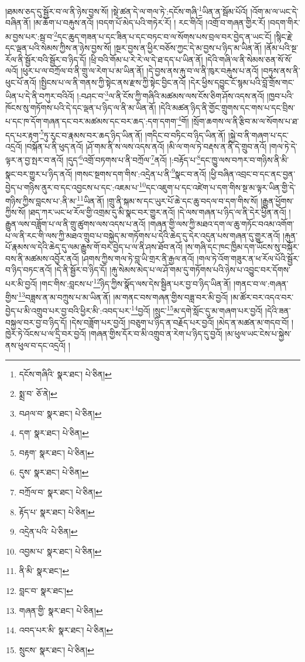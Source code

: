 །ཐམས་ཅད་དུ་སྦྱོར་བ་ལ་ནི་ཉེས་བྱས་སོ། །སྡེ་ཚན་དེ་ལ་གལ་ཏེ་:དངོས་གཞི་\footnote{དངོས་གཞིའི་  སྣར་ཐང་།  པེ་ཅིན། }ཡིན་ན་སྦོམ་པོའོ། །འོག་མ་ལ་ཡང་དེ་བཞིན་ནོ། །མ་ཆོག་པ་བརྐུས་ནའོ། །བདག་པོ་མེད་པའི་གཏེར་རོ། །
རང་གིའོ། །འགྲོ་བ་གཞན་གྱིར་རོ། །བདག་གིར་མ་བྱས་པར་:སྦ་བ་\footnote{སྨྲ་བ་  ཅོ་ནེ། }དང་ཆུད་གཟན་པ་དང་ཟིན་པ་དང་བཏང་བ་ལ་སོགས་པས་བྲལ་བར་བྱེད་ན་ཡང་ངོ། །སྙིང་རྗེ་དང་ལྡན་པའི་སེམས་ཀྱིས་ན་ཉེས་བྱས་སོ། །སྔར་བྱས་ན་ཕྱིར་བཅོས་ཀྱང་དེ་མ་བྱས་པ་ཉིད་མ་ཡིན་ནོ། །ནོམ་པའི་སྔ་རོལ་ནི་སྦྱོར་བའི་སྦྱོར་བ་ཉིད་དོ། །ཕྲི་བའི་གོམ་པ་རེ་རེ་ལ་དེ་ཐ་དད་པ་ཡིན་ནོ། །དེའི་གཞི་ལ་ནི་སེམས་ཅན་སོ་སོ་ལའོ། །ཕུར་པ་ལ་བཀྲོལ་བ་ནི་གྲུ་ལ་རེག་པ་མ་ཡིན་ནོ། །དེ་བྱས་ནས་རྐུ་བ་ལ་ནི་ཁུར་བརྐུས་པ་ནའོ། །བཏུས་ནས་ནི་ཕུང་པོ་ནའོ། །སྤྱིངས་པ་ལ་ནི་གནས་ཀྱི་སྟེང་ནས་རྫས་ཀྱི་སྟེང་བྱིང་ནའོ། །དེར་ཕྱིས་དབྱུང་ངོ་སྙམ་པའི་བློ་གྲོས་གང་ཡིན་པ་དེ་ནི་བཀུར་བའིའོ། །:བཤང་བ་\footnote{བཤལ་བ་  སྣར་ཐང་།  པེ་ཅིན། }ལ་ནི་ངོས་ཀྱི་གཞིའི་མཚམས་ལས་ངོས་ཅིག་ཤོས་འདས་ནའོ། །ཁྱབ་པའི་ཁོངས་སུ་གཏོགས་པའི་དེ་དང་ལྡན་པ་ཉིད་ལ་ནི་མ་ཡིན་ནོ། །དེའི་མཚན་ཉིད་ནི་གྱོང་གྲུགས་དང་གས་པ་དང་བྲིས་པ་དང་ཁ་དོག་གཞན་དང་བར་མཚམས་དང་བར་ཆད་:དག་དགག་\footnote{དག་  སྣར་ཐང་།  པེ་ཅིན། }གོ། །སྲོག་ཆགས་ལ་ནི་རྩིབ་མ་ལ་སོགས་པ་ཐ་དད་པར་རྟག་\footnote{བརྟག་  སྣར་ཐང་།  པེ་ཅིན། }ཏུ་རུང་བ་རྣམས་བར་ཆད་ཉིད་ཡིན་ནོ། །གདིང་བ་བཏིང་བ་ཉིད་ཡིན་ནོ། །སྐྱེ་བ་ནི་གཞག་པ་དང་འདྲའོ། །བསྐོན་པ་ནི་ཕུད་ནའོ། །ཤོ་གམ་ནི་ས་ལས་འདས་ནའོ། །མི་ལ་གལ་ཏེ་བརྡས་ན་ནི་དེ་གྲུབ་ནའོ། །གལ་ཏེ་དེ་ལྟར་ན་བྱ་སྤར་བ་ནའོ། །དུད་\footnote{དུས་  སྣར་ཐང་།  པེ་ཅིན། }འགྲོ་བཏགས་པ་ནི་བཀྲོལ་\footnote{བཀྲོལ་བ་  སྣར་ཐང་།  པེ་ཅིན། }ནའོ། །:བརྟོད་པ་\footnote{རྟོད་པ་  སྣར་ཐང་།  པེ་ཅིན། }དང་ཁྱུ་ལས་བཀར་བ་གཉིས་ནི་མི་སྣང་བར་གྱུར་པ་ཉིད་ནའོ། །གསང་སྔགས་དག་གིས་:འདྲེན་པ་ནི་\footnote{འདྲེན་པའི་  པེ་ཅིན། }སྣང་བ་ནའོ། །ཕྱི་བཞིན་འབྲང་བ་དང་ནང་བྱན་བྱེད་པ་གཉིས་ནུར་བ་དང་འབྱངས་པ་དང་:འཇམ་པ་\footnote{འབྱམ་པ་  སྣར་ཐང་།  པེ་ཅིན། }དང་འཇུག་པ་དང་འཛེག་པ་དག་གིས་སྔ་མ་ལྟར་ཡིན་གྱི་དེ་གཉིས་ཀྱིས་བླངས་པ་:ནི་མ་\footnote{ནི་མི་  སྣར་ཐང་། }ཡིན་ནོ། །གྲུ་ནི་སྐམ་ས་དང་ཡུར་པོ་ཆེ་དང་ཆུ་བདལ་བ་དག་གིས་སོ། །རྒྱུན་ཕྱོགས་ཀྱིས་སོ། །ཐད་ཀར་ཡང་ཕ་རོལ་གྱི་འགྲམ་དུ་མི་སྣང་བར་གྱུར་ནའོ། །དེ་ལས་གཞན་པ་ཉིད་ལ་ནི་དེར་ཕྱིན་ནའོ། །རྒྱུན་ལས་བཟློག་པ་ལ་ནི་གྲུ་ཚུགས་ལས་འདས་པ་ནའོ། །གཞན་གྱི་ལས་ཀྱི་མཐའ་དག་ལ་ཆུ་གཏོང་བའམ་འགོག་པ་ལ་ནི་རང་གི་ལས་ཀྱི་མཐའ་གྲུབ་པ་བསྐྱེད་མ་གཏོགས་པ་དེའི་ཆེད་དུ་དེར་འདུན་པས་གཞན་དུ་གྱུར་ནའོ། །རྐུན་པོ་རྣམས་ལ་དེའི་ཆེད་དུ་ལམ་རྒྱུས་གོ་བར་བྱེད་པ་ལ་ནི་ཤས་ཐོབ་ནའོ། །ས་གཞི་དང་ཁང་ཁྱིམ་དག་ཡོངས་སུ་བསྐོར་བས་ནི་མཚམས་འབྱོར་ནའོ། །ཤགས་ཀྱིས་གལ་ཏེ་བླ་ཡི་གྲར་ནི་རྒྱལ་ནའོ། །གལ་ཏེ་འོག་གཟུར་ན་ཕ་རོལ་པོའི་སྦྱོར་བ་ཉིད་བཏང་ནའོ། །དེ་ནི་སྦྱོར་བ་ཉིད་དོ། །རྐུ་སེམས་མེད་པ་ལ་ཤོ་གམ་དུ་གཏོགས་པའི་ཉེས་པ་འབྱུང་བར་དོགས་པར་མི་བྱའོ། །གང་གིས་:བླངས་པ་\footnote{བླང་བ་  སྣར་ཐང་། }ཉིད་ཀྱིས་སྣོད་ལས་དེས་སྦྱིན་པར་བྱ་བ་ཉིད་ཡིན་ནོ། །གནང་བ་ལ་:གཞན་གྱིས་\footnote{གཞན་གྱི་  སྣར་ཐང་།  པེ་ཅིན། }བཟླས་ན་མ་བཀྲུས་པ་མ་ཡིན་ནོ། །མ་གནང་བས་གཞན་གྱིས་བཟླ་བར་མི་བྱའོ། །མ་ཚོར་བར་འདའ་བར་བྱེད་པ་མི་འགྲུབ་པར་བྱ་བའི་ཕྱིར་མི་:འབད་པར་\footnote{འབད་པར་མི་  སྣར་ཐང་།  པེ་ཅིན། }བྱའོ། །སྲུང་\footnote{སྲུངས་  སྣར་ཐང་།  པེ་ཅིན། }མ་དགེ་སློང་དུ་མ་གཞག་པར་བྱའོ། །དེའི་ཟན་བསྐྱལ་བར་བྱ་བ་ཉིད་དོ། །དེས་བཟློག་པར་བྱའོ། །བཅུག་པ་ཉིད་ན་བརྗོད་པར་བྱའོ། །མེད་ན་མཚན་མ་གདབ་བོ། །ཁྱེར་ཏེ་འོངས་པ་ལ་དྲི་བར་བྱའོ། །གཞན་གྱིས་དོར་བ་མི་འགྲུབ་ན་རེག་པ་ཉིད་དུ་བྱའོ། །མ་ཕུལ་ཡང་ངེས་པ་སྐྱེས་ནས་ཕུལ་བ་དང་འདྲའོ། །
